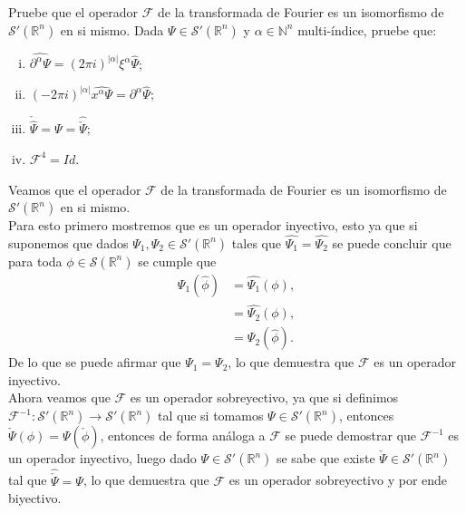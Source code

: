 \begin{homeworkProblem}
  Pruebe que el operador $\mathcal{F}$ de la transformada de Fourier es un isomorfismo de $\mathcal{S}'(\mathbb{R}^{n})$ en si mismo. Dada $\Psi \in \mathcal{S}'(\mathbb{R}^{n})$ y $\alpha\in\mathbb{N}^{n}$ multi-índice, pruebe que:
  \begin{enumerate}[(i)]
    \item $\hat{\partial^{\alpha}\Psi}=(2\pi i)^{|\alpha|}\xi^{\alpha}\hat{\Psi}$;
    \item $(-2\pi i)^{|\alpha|}\hat{x^{\alpha}\Psi}=\partial^{\alpha}\hat{\Psi}$;
    \item $\check{\hat{\Psi}}=\Psi=\hat{\check{\Psi}}$;
    \item $\mathcal{F}^{4}=Id$.
  \end{enumerate}
  \begin{solution}
    Veamos que el operador $\mathcal{F}$ de la transformada de Fourier es un isomorfismo de $\mathcal{S}'(\mathbb{R}^{n})$ en si mismo.\\
    Para esto primero mostremos que es un operador inyectivo, esto ya que si suponemos que dados $\Psi_{1},\Psi_{2}\in\mathcal{S}'(\mathbb{R}^{n})$ tales que $\hat{\Psi_{1}}=\hat{\Psi_{2}}$ se puede concluir que para toda $\phi\in\mathcal{S}(\mathbb{R}^{n})$ se cumple que
    \begin{align*}
      \Psi_{1}(\hat{\phi})&=\hat{\Psi_{1}}(\phi),\\
      &=\hat{\Psi_{2}}(\phi),\\
      &=\Psi_{2}(\hat{\phi}).
    \end{align*}
    De lo que se puede afirmar que $\Psi_{1}=\Psi_{2}$, lo que demuestra que $\mathcal{F}$ es un operador inyectivo.\\
    Ahora veamos que $\mathcal{F}$ es un operador sobreyectivo, ya que si definimos $\mathcal{F}^{-1}:\mathcal{S}'(\mathbb{R}^{n})\to\mathcal{S}'(\mathbb{R}^{n})$ tal que si tomamos $\Psi\in\mathcal{S}'(\mathbb{R}^{n})$, entonces $\check{\Psi}(\phi)=\Psi(\check{\phi})$, entonces de forma análoga a $\mathcal{F}$ se puede demostrar que $\mathcal{F}^{-1}$ es un operador inyectivo, luego dado $\Psi\in\mathcal{S}'(\mathbb{R}^{n})$ se sabe que existe $\check{\Psi}\in\mathcal{S}'(\mathbb{R}^{n})$ tal que $\hat{\check{\Psi}}=\Psi$, lo que demuestra que $\mathcal{F}$ es un operador sobreyectivo y por ende biyectivo. 
  \end{solution}
\end{homeworkProblem}
